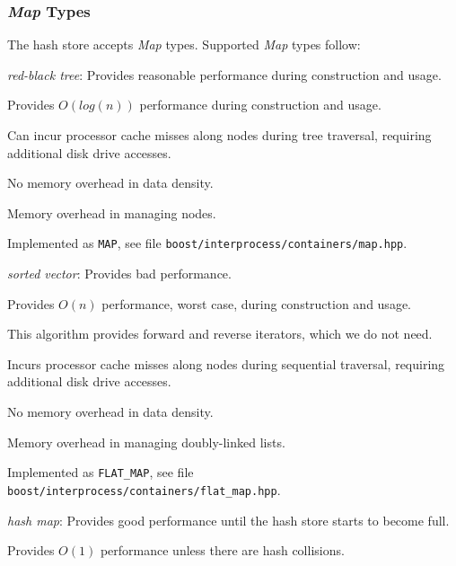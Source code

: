 \documentclass[10pt,twoside]{article}
\begin{document}
\subsubsection{\emph{Map} Types}
The hash store accepts \emph{Map} types.
Supported \emph{Map} types follow:
\begin{compactitem}
\item \emph{red-black tree}:
Provides reasonable performance during construction and usage.
\begin{compactitem}
\item Provides \begin{math}{O(log(n))}\end{math} performance during construction and usage.
\item Can incur processor cache misses along nodes during tree traversal,
requiring additional disk drive accesses.
\item No memory overhead in data density.
\item Memory overhead in managing nodes.
\item Implemented as \texttt{MAP},
see file \texttt{boost/interprocess/containers/map.hpp}.
\end{compactitem}
\item \emph{sorted vector}:
Provides bad performance.
\begin{compactitem}
\item Provides \begin{math}{O(n)}\end{math} performance, worst case, during construction and usage.
\item This algorithm provides forward and reverse iterators, which we do not need.
\item Incurs processor cache misses along nodes during sequential traversal,
requiring additional disk drive accesses.
\item No memory overhead in data density.
\item Memory overhead in managing doubly-linked lists.
\item Implemented as \texttt{FLAT\_MAP},
see file \texttt{boost/interprocess/containers/flat\_map.hpp}.
\end{compactitem}
\item \emph{hash map}:
Provides good performance until the hash store starts to become full.
\begin{compactitem}
\item Provides \begin{math}{O(1)}\end{math} performance unless there are hash collisions.

\end{compactitem}
\end{compactitem}
\end{document}
